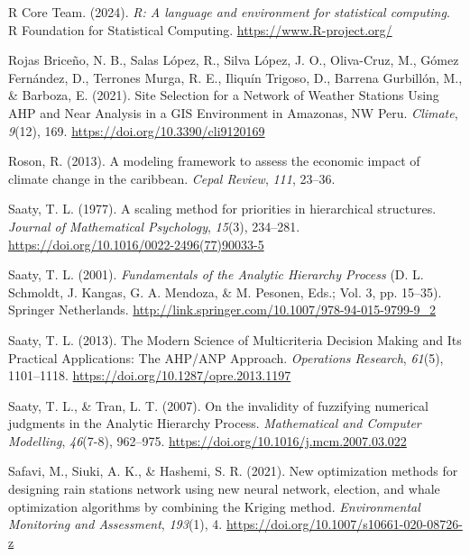 \documentclass[spanish]{article}
\newlength{\cslhangindent}
\newlength{\cslentryspacingunit} %
\newenvironment{CSLReferences}[2] %
 {%
  \setlength{\parindent}{0pt}
  \ifodd #1
  \let\oldpar\par
  \def\par{\hangindent=\cslhangindent\oldpar}
  \fi
  \setlength{\parskip}{#2\cslentryspacingunit}
 }%
 {}
\begin{document}
\begin{CSLReferences}{1}{0}
\leavevmode{}%
R Core Team. (2024). \emph{R: A language and environment for statistical
computing}. R Foundation for Statistical Computing.
\url{https://www.R-project.org/}

\leavevmode{}%
Rojas Briceño, N. B., Salas López, R., Silva López, J. O., Oliva-Cruz,
M., Gómez Fernández, D., Terrones Murga, R. E., Iliquín Trigoso, D.,
Barrena Gurbillón, M., \& Barboza, E. (2021). Site Selection for a
Network of Weather Stations Using AHP and Near Analysis in a GIS
Environment in Amazonas, NW Peru. \emph{Climate}, \emph{9}(12), 169.
\url{https://doi.org/10.3390/cli9120169}

\leavevmode{}%
Roson, R. (2013). A modeling framework to assess the economic impact of
climate change in the caribbean. \emph{Cepal Review}, \emph{111},
23--36.

\leavevmode{}%
Saaty, T. L. (1977). A scaling method for priorities in hierarchical
structures. \emph{Journal of Mathematical Psychology}, \emph{15}(3),
234--281. \url{https://doi.org/10.1016/0022-2496(77)90033-5}

\leavevmode{}%
Saaty, T. L. (2001). \emph{Fundamentals of the Analytic Hierarchy
Process} (D. L. Schmoldt, J. Kangas, G. A. Mendoza, \& M. Pesonen, Eds.;
Vol. 3, pp. 15--35). Springer Netherlands.
\url{http://link.springer.com/10.1007/978-94-015-9799-9_2}

\leavevmode{}%
Saaty, T. L. (2013). The Modern Science of Multicriteria Decision Making
and Its Practical Applications: The AHP/ANP Approach. \emph{Operations
Research}, \emph{61}(5), 1101--1118.
\url{https://doi.org/10.1287/opre.2013.1197}

\leavevmode{}%
Saaty, T. L., \& Tran, L. T. (2007). On the invalidity of fuzzifying
numerical judgments in the Analytic Hierarchy Process.
\emph{Mathematical and Computer Modelling}, \emph{46}(7-8), 962--975.
\url{https://doi.org/10.1016/j.mcm.2007.03.022}

\leavevmode{}%
Safavi, M., Siuki, A. K., \& Hashemi, S. R. (2021). New optimization
methods for designing rain stations network using new neural network,
election, and whale optimization algorithms by combining the Kriging
method. \emph{Environmental Monitoring and Assessment}, \emph{193}(1),
4. \url{https://doi.org/10.1007/s10661-020-08726-z}


\end{CSLReferences}
\end{document}
